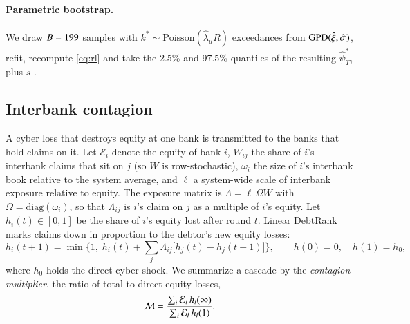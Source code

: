 \paragraph{Parametric bootstrap.} We draw $B = 199$ samples with $k^\ast\sim\mathrm{Poisson}(\hat\lambda_u R)$ exceedances from $\mathrm{GPD}(\hat\xi,\hat\sigma)$, refit, recompute \cref{eq:rl} and take the 2.5\% and 97.5\% quantiles of the resulting $\hat\psi^\ast_T$, plus $\bar s$ \citep{davison1997}.

\subsection{Interbank contagion}\label{sec:contagion}

A cyber loss that destroys equity at one bank is transmitted to the banks that hold claims on it. Let $\mathcal{E}_i$ denote the equity of bank $i$, $W_{ij}$ the share of $i$'s interbank claims that sit on $j$ (so $W$ is row-stochastic), $\omega_i$ the size of $i$'s interbank book relative to the system average, and $\ell$ a system-wide scale of interbank exposure relative to equity. The exposure matrix is $\Lambda = \ell\, \Omega W$ with $\Omega = \mathrm{diag}(\omega_i)$, so that $\Lambda_{ij}$ is $i$'s claim on $j$ as a multiple of $i$'s equity. Let $h_i(t)\in[0,1]$ be the share of $i$'s equity lost after round $t$. Linear DebtRank \citep{bardoscia2015} marks claims down in proportion to the debtor's new equity losses:
\begin{equation}\label{eq:debtrank}
h_i(t+1) = \min\Big\{1,\; h_i(t) + \sum_j \Lambda_{ij}\big[h_j(t)-h_j(t-1)\big]\Big\},\qquad h(0)=0,\quad h(1)=h_0,
\end{equation}
where $h_0$ holds the direct cyber shock. We summarize a cascade by the \emph{contagion multiplier}, the ratio of total to direct equity losses,
\begin{equation}\label{eq:mult}
\mathcal{M} = \frac{\sum_i \mathcal{E}_i\, h_i(\infty)}{\sum_i \mathcal{E}_i\, h_i(1)} .
\end{equation}

